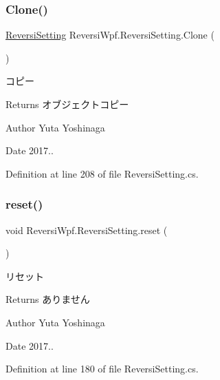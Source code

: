 \subsubsection{\texorpdfstring{Clone()}{Clone()}}
{\footnotesize\ttfamily \hyperlink{class_reversi_wpf_1_1_reversi_setting}{Reversi\+Setting} Reversi\+Wpf.\+Reversi\+Setting.\+Clone (\begin{DoxyParamCaption}{ }\end{DoxyParamCaption})}



コピー 

\begin{DoxyReturn}{Returns}
オブジェクトコピー 
\end{DoxyReturn}
\begin{DoxyAuthor}{Author}
Yuta Yoshinaga 
\end{DoxyAuthor}
\begin{DoxyDate}{Date}
2017.. 
\end{DoxyDate}


Definition at line 208 of file Reversi\+Setting.\+cs.

\mbox{\label{class_reversi_wpf_1_1_reversi_setting_abfa8cacbb6a45668ed099a9a8360bdff}} 
\subsubsection{\texorpdfstring{reset()}{reset()}}
{\footnotesize\ttfamily void Reversi\+Wpf.\+Reversi\+Setting.\+reset (\begin{DoxyParamCaption}{ }\end{DoxyParamCaption})}



リセット 

\begin{DoxyReturn}{Returns}
ありません 
\end{DoxyReturn}
\begin{DoxyAuthor}{Author}
Yuta Yoshinaga 
\end{DoxyAuthor}
\begin{DoxyDate}{Date}
2017.. 
\end{DoxyDate}


Definition at line 180 of file Reversi\+Setting.\+cs.



